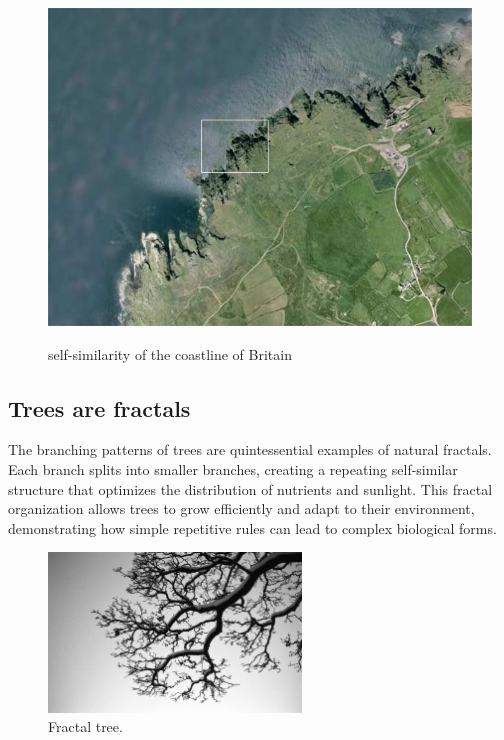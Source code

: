 \documentclass[12pt]{article}
\begin{document}
\begin{figure}[H]
\begin{minipage}[b]{0.5\textwidth}
        \label{fig:uk3}
    \end{minipage}
    \hspace{0.05\textwidth} %
    \begin{minipage}[b]{0.5\textwidth}
        \centering
        \includegraphics[width=\textwidth]{assets/uk4.jpg}
        \label{fig:uk4}
    \end{minipage}
        \caption{self-similarity of the coastline of Britain}
\end{figure}

\subsection{Trees are fractals}
The branching patterns of trees are quintessential examples of natural fractals. Each branch splits into smaller branches, creating a repeating self-similar structure that optimizes the distribution of nutrients and sunlight. This fractal organization allows trees to grow efficiently and adapt to their environment, demonstrating how simple repetitive rules can lead to complex biological forms.

\begin{figure}[H]
\centering
\includegraphics[width=0.6\textwidth]{assets/fractal-tree.jpg}
\caption{Fractal tree.}
\label{fig:fractal-tree}
\end{figure}
\end{document}
